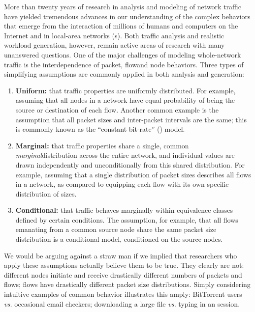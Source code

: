 \documentclass[twocolumn,final]{svjour3}
\newcommand{\caps}[1]{{\smaller{#1}}}
\newcommand{\latin}[1]{\textit{#1}}
\begin{document}
More than twenty years of research in analysis and modeling of network traffic have yielded tremendous advances in our understanding of the complex behaviors that emerge from the interaction of millions of humans and computers on the Internet and in local-area networks (\caps{LAN}s).
Both traffic analysis and realistic workload generation, however, remain active areas of research with many unanswered questions.
One of the major challenges of modeling whole-network traffic is the interdependence of packet, flow\flownote and node behaviors.
Three types of simplifying assumptions are commonly applied in both analysis and generation:
\begin{enumerate}
\item \textbf{Uniform:} that traffic properties are uniformly distributed. For example, assuming that  all nodes in a network have equal probability of being the source or destination of each flow.
Another common example is the assumption that all packet sizes and inter-packet intervals are the same; this is commonly known as the ``constant bit-rate'' (\caps{CBR}) model.
\item \textbf{Marginal:} that traffic properties share a single, common \emph{marginal}\marginalnote distribution across the entire network, and individual values are drawn independently and unconditionally from this shared distribution.
For example, assuming that a single distribution of packet sizes describes all flows in a network, as compared to equipping each flow with its own specific distribution of sizes.
\item \textbf{Conditional:} that traffic behaves marginally within equivalence classes defined by certain conditions.
The assumption, for example, that all flows emanating from a common source node share the same packet size distribution is a conditional model, conditioned on the source nodes.
\end{enumerate}
We would be arguing against a straw man if we implied that researchers who apply these assumptions actually believe them to be true.
They clearly are not:
different nodes initiate and receive drastically different numbers of packets and flows;
flows have drastically different packet size distributions.
Simply considering intuitive examples of common behavior illustrates this amply:
BitTorrent users \latin{vs.} occasional email checkers;
downloading a large file \latin{vs.} typing in an \caps{SSH} session.

\end{document}
